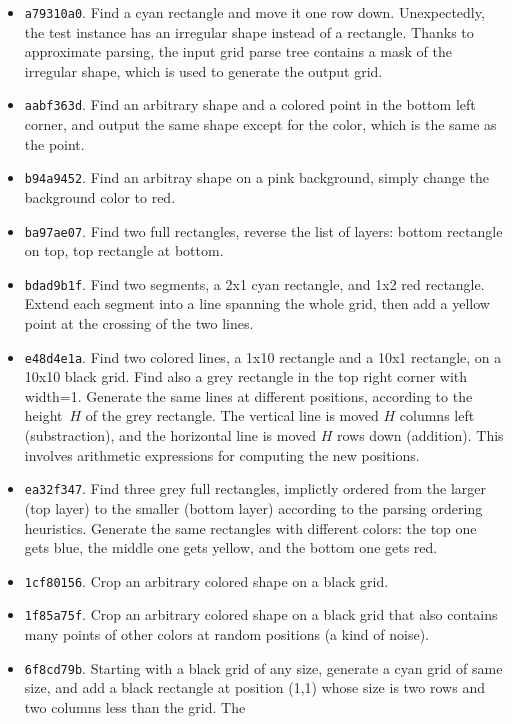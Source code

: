 \documentclass[a4paper]{llncs}
\begin{document}
\begin{itemize}
\item {\tt a79310a0}. Find a cyan rectangle and move it one row
  down. Unexpectedly, the test instance has an irregular shape instead
  of a rectangle. Thanks to approximate parsing, the input grid parse
  tree contains a mask of the irregular shape, which is used to
  generate the output grid.
\item {\tt aabf363d}. Find an arbitrary shape and a colored point in
  the bottom left corner, and output the same shape except for the
  color, which is the same as the point.
\item {\tt b94a9452}. Find an arbitray shape on a pink background,
  simply change the background color to red.
\item {\tt ba97ae07}. Find two full rectangles, reverse the list of
  layers: bottom rectangle on top, top rectangle at bottom.
\item {\tt bdad9b1f}. Find two segments, a 2x1 cyan rectangle, and 1x2
  red rectangle. Extend each segment into a line spanning the whole
  grid, then add a yellow point at the crossing of the two lines.
\item {\tt e48d4e1a}. Find two colored lines, a 1x10 rectangle and a
  10x1 rectangle, on a 10x10 black grid. Find also a grey rectangle in
  the top right corner with width=1. Generate the same lines at
  different positions, according to the height~$H$ of the grey
  rectangle. The vertical line is moved $H$ columns left
  (substraction), and the horizontal line is moved $H$ rows down
  (addition). This involves arithmetic expressions for computing the
  new positions.
\item {\tt ea32f347}. Find three grey full rectangles, implictly
  ordered from the larger (top layer) to the smaller (bottom layer)
  according to the parsing ordering heuristics. Generate the same
  rectangles with different colors: the top one gets blue, the middle
  one gets yellow, and the bottom one gets red.
\item {\tt 1cf80156}. Crop an arbitrary colored shape on a black grid.
\item {\tt 1f85a75f}. Crop an arbitrary colored shape on a black grid
  that also contains many points of other colors at random positions
  (a kind of noise).
\item {\tt 6f8cd79b}. Starting with a black grid of any size, generate
  a cyan grid of same size, and add a black rectangle at position
  (1,1) whose size is two rows and two columns less than the grid. The

\end{itemize}
\end{document}
